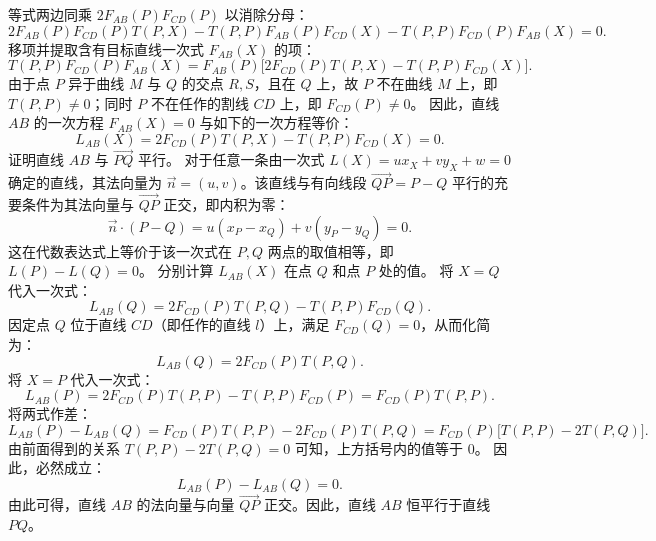 \begin{solution}
等式两边同乘 $2F_{AB}(P) F_{CD}(P)$ 以消除分母：
\[ 2F_{AB}(P) F_{CD}(P) T(P, X) - T(P, P) F_{AB}(P) F_{CD}(X) - T(P, P) F_{CD}(P) F_{AB}(X) = 0. \]
移项并提取含有目标直线一次式 $F_{AB}(X)$ 的项：
\[ T(P, P) F_{CD}(P) F_{AB}(X) = F_{AB}(P) \big[ 2F_{CD}(P) T(P, X) - T(P, P) F_{CD}(X) \big]. \]
由于点 $P$ 异于曲线 $M$ 与 $Q$ 的交点 $R, S$，且在 $Q$ 上，故 $P$ 不在曲线 $M$ 上，即 $T(P, P) \neq 0$；同时 $P$ 不在任作的割线 $CD$ 上，即 $F_{CD}(P) \neq 0$。
因此，直线 $AB$ 的一次方程 $F_{AB}(X) = 0$ 与如下的一次方程等价：
\[ L_{AB}(X) = 2F_{CD}(P) T(P, X) - T(P, P) F_{CD}(X) = 0. \]
证明直线 $AB$ 与 $\overrightarrow{PQ}$ 平行。
对于任意一条由一次式 $L(X) = u x_X + v y_X + w = 0$ 确定的直线，其法向量为 $\vec{n} = (u, v)$。该直线与有向线段 $\overrightarrow{QP} = P - Q$ 平行的充要条件为其法向量与 $\overrightarrow{QP}$ 正交，即内积为零：
\[ \vec{n} \cdot (P - Q) = u(x_P - x_Q) + v(y_P - y_Q) = 0. \]
这在代数表达式上等价于该一次式在 $P, Q$ 两点的取值相等，即 $L(P) - L(Q) = 0$。
分别计算 $L_{AB}(X)$ 在点 $Q$ 和点 $P$ 处的值。
将 $X = Q$ 代入一次式：
\[ L_{AB}(Q) = 2F_{CD}(P) T(P, Q) - T(P, P) F_{CD}(Q). \]
因定点 $Q$ 位于直线 $CD$（即任作的直线 $l$）上，满足 $F_{CD}(Q) = 0$，从而化简为：
\[ L_{AB}(Q) = 2F_{CD}(P) T(P, Q). \]
将 $X = P$ 代入一次式：
\[ L_{AB}(P) = 2F_{CD}(P) T(P, P) - T(P, P) F_{CD}(P) = F_{CD}(P) T(P, P). \]
将两式作差：
\[ L_{AB}(P) - L_{AB}(Q) = F_{CD}(P) T(P, P) - 2F_{CD}(P) T(P, Q) = F_{CD}(P) \big[ T(P, P) - 2T(P, Q) \big]. \]
由前面得到的关系 $T(P, P) - 2T(P, Q) = 0$ 可知，上方括号内的值等于 $0$。
因此，必然成立：
\[ L_{AB}(P) - L_{AB}(Q) = 0. \]
由此可得，直线 $AB$ 的法向量与向量 $\overrightarrow{QP}$ 正交。因此，直线 $AB$ 恒平行于直线 $PQ$。
\end{solution}


